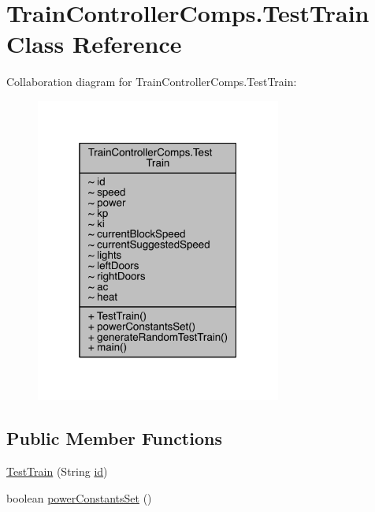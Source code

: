 \hypertarget{classTrainControllerComps_1_1TestTrain}{}\section{Train\+Controller\+Comps.\+Test\+Train Class Reference}
\label{classTrainControllerComps_1_1TestTrain}


Collaboration diagram for Train\+Controller\+Comps.\+Test\+Train\+:
\nopagebreak
\begin{figure}[H]
\begin{center}
\leavevmode
\includegraphics[width=229pt]{classTrainControllerComps_1_1TestTrain__coll__graph}
\end{center}
\end{figure}
\subsection*{Public Member Functions}
\begin{DoxyCompactItemize}
\item 
\hyperlink{classTrainControllerComps_1_1TestTrain_abf782fec0223ecf2fbf046fa4a8c5053}{Test\+Train} (String \hyperlink{classTrainControllerComps_1_1TestTrain_a9e1acb4fe54e1d3cebdbf45aa70c74b3}{id})
\item 
boolean \hyperlink{classTrainControllerComps_1_1TestTrain_aeae0e0501dad3d4529679d01c7baca6b}{power\+Constants\+Set} ()
\end{DoxyCompactItemize}
